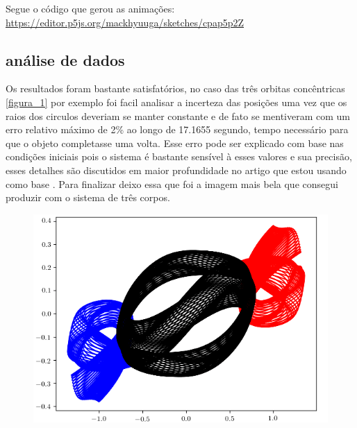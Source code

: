 \documentclass[a4paper.12pt]{article}
\begin{document}
	Segue o código que gerou as animações: \url{https://editor.p5js.org/mackhyuuga/sketches/cpap5p2Z}
	
	
	\clearpage
\subsection{análise de dados}

	Os resultados foram bastante satisfatórios, no caso das três orbitas concêntricas \ref{figura_1} por exemplo foi facil analisar a incerteza das posições uma vez que os raios dos circulos deveriam se manter constante e de fato se mentiveram com um erro relativo máximo de 2\% ao longo de 17.1655 segundo, tempo necessário para que o objeto completasse uma volta. Esse erro pode ser explicado com base nas condições iniciais pois o sistema é bastante sensível à esses valores e sua precisão, esses detalhes são discutidos em maior profundidade no artigo que estou usando como base \cite{coreografias}. Para finalizar deixo essa que foi a imagem mais bela que consegui produzir com o sistema de três corpos.
	
	\begin{figure}[H]
		\includegraphics[scale=0.75]{Figure_3.png}
	\end{figure}
	
\clearpage


\end{document}
